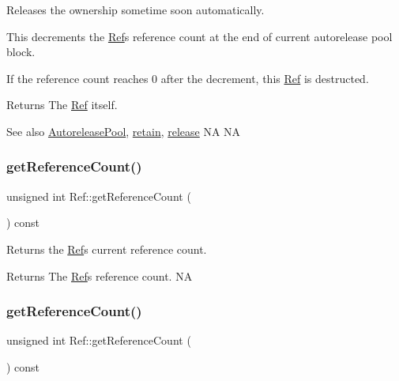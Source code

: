 Releases the ownership sometime soon automatically.

This decrements the \hyperlink{classRef}{Ref}\textquotesingle{}s reference count at the end of current autorelease pool block.

If the reference count reaches 0 after the decrement, this \hyperlink{classRef}{Ref} is destructed.

\begin{DoxyReturn}{Returns}
The \hyperlink{classRef}{Ref} itself.
\end{DoxyReturn}
\begin{DoxySeeAlso}{See also}
\hyperlink{classAutoreleasePool}{Autorelease\+Pool}, \hyperlink{classRef_a7d182cae1be1e80a9884cacd6ff9cb01}{retain}, \hyperlink{classRef_a6c8528cd8731765688943496c2eb3907}{release}  NA  NA 
\end{DoxySeeAlso}
\mbox{\label{classRef_a27b894ccc4c74b0c52f3fa2993f04ba0}} 
\subsubsection{\texorpdfstring{get\+Reference\+Count()}{getReferenceCount()}\hspace{0.1cm}{\footnotesize\ttfamily [1/2]}}
{\footnotesize\ttfamily unsigned int Ref\+::get\+Reference\+Count (\begin{DoxyParamCaption}{ }\end{DoxyParamCaption}) const}

Returns the \hyperlink{classRef}{Ref}\textquotesingle{}s current reference count.

\begin{DoxyReturn}{Returns}
The \hyperlink{classRef}{Ref}\textquotesingle{}s reference count.  NA 
\end{DoxyReturn}
\mbox{\label{classRef_a27b894ccc4c74b0c52f3fa2993f04ba0}} 
\subsubsection{\texorpdfstring{get\+Reference\+Count()}{getReferenceCount()}\hspace{0.1cm}{\footnotesize\ttfamily [2/2]}}
{\footnotesize\ttfamily unsigned int Ref\+::get\+Reference\+Count (\begin{DoxyParamCaption}{ }\end{DoxyParamCaption}) const}

